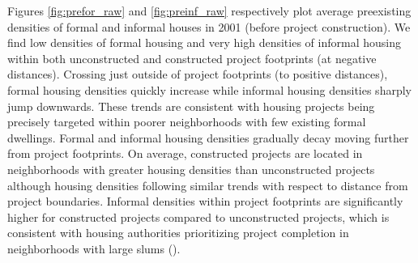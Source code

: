 \documentclass[12pt]{article}
\begin{document}
Figures \ref{fig:prefor_raw} and \ref{fig:preinf_raw} respectively plot average preexisting densities of formal and informal houses in 2001 (before project construction).  We find low densities of formal housing and very high densities of informal housing within both unconstructed and constructed project footprints (at negative distances).  Crossing just outside of project footprints (to positive distances), formal housing densities quickly increase while informal housing densities sharply jump downwards.  These trends are consistent with housing projects being precisely targeted within poorer neighborhoods with few existing formal dwellings.  Formal and informal housing densities gradually decay moving further from project footprints.  On average, constructed projects are located in neighborhoods with greater housing densities than unconstructed projects although housing densities following similar trends with respect to distance from project boundaries.  Informal densities within project footprints are significantly higher for constructed projects compared to unconstructed projects, which is consistent with housing authorities prioritizing project completion in neighborhoods with large slums (\cite{hofmeyr2008risk}).


\end{document}
